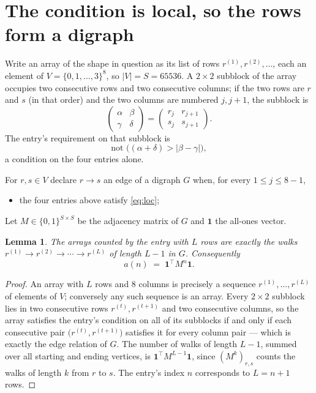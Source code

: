 \documentclass[11pt,a4paper]{article}
\theoremstyle{plain}
\newtheorem{lemma}[theorem]{Lemma}
\theoremstyle{definition}
\begin{document}
\section{The condition is local, so the rows form a digraph}

Write an array of the shape in question as its list of rows
$r^{(1)},r^{(2)},\dots$, each an element of
$V=\{0,1,\dots,3\}^{8}$, so $|V|=S=65536$. A $2\times2$ subblock of the array
occupies two consecutive rows and two consecutive columns; if the two rows are $r$
and $s$ (in that order) and the two columns are numbered $j,j+1$,
the subblock is
\[
\begin{pmatrix}\alpha&\beta\\\gamma&\delta\end{pmatrix}=\begin{pmatrix}r_j&r_{j+1}\\s_j&s_{j+1}\end{pmatrix}.
\]
The entry's requirement on that subblock is
\begin{equation}\label{eq:loc}
\text{not }\bigl((\alpha+\delta)>|\beta-\gamma|\bigr),
\end{equation}
a condition on the four entries alone.

For $r,s\in V$ declare $r\to s$ an edge of a digraph $G$ when, for every
$1\le j\le 8-1$,
\begin{itemize}
\item the four entries above satisfy \eqref{eq:loc};

\end{itemize}
Let $M\in\{0,1\}^{S\times S}$ be the adjacency matrix of $G$ and $\mathbf{1}$ the
all-ones vector.

\begin{lemma}\label{lem:walk}
The arrays counted by the entry with $L$ rows are exactly the walks
$r^{(1)}\to r^{(2)}\to\cdots\to r^{(L)}$ of length $L-1$ in $G$. Consequently
\[
a(n)\;=\;\mathbf{1}^{\!\top}M^{n}\mathbf{1} .
\]
\end{lemma}

\begin{proof}
An array with $L$ rows and $8$ columns is precisely a sequence
$r^{(1)},\dots,r^{(L)}$ of elements of $V$; conversely any such sequence is an array.
Every $2\times2$ subblock lies in two consecutive rows $r^{(t)},r^{(t+1)}$ and two
consecutive columns, so the array satisfies the entry's condition on all of its subblocks
if and only if each consecutive pair $\bigl(r^{(t)},r^{(t+1)}\bigr)$ satisfies it for
every column pair --- which is exactly the edge relation of $G$. The number of walks of
length $L-1$, summed over all starting and ending vertices, is
$\mathbf{1}^{\!\top}M^{L-1}\mathbf{1}$, since $(M^{k})_{r,s}$ counts the walks of
length $k$ from $r$ to $s$. The entry's index $n$ corresponds to $L=n+1$ rows.
\end{proof}
\end{document}
